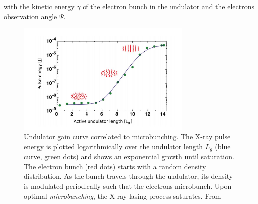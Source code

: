 with the kinetic energy $\gamma$ of the electron bunch in the undulator and the electrons observation angle $\Psi$.\\
\begin{figure}
	\centering
		\includegraphics[width=0.75\textwidth]{images/gain-length.JPG}
	\caption[Undulator gain curve correlated to microbunching.]{Undulator gain curve correlated to microbunching. The X-ray pulse energy is plotted logarithmically over the undulator length $L_{g}$ (blue curve, green dots) and shows an exponential growth until saturation. The electron bunch (red dots) starts with a random density distribution. As the bunch travels through the undulator, its density is modulated periodically such that the electrons microbunch. Upon optimal \textit{microbunching}, the X-ray lasing process saturates. From \citep{Rupp-2013-Thesis,Rupp-2016-Springer}}
	\label{fig:gain-length}
\end{figure}
